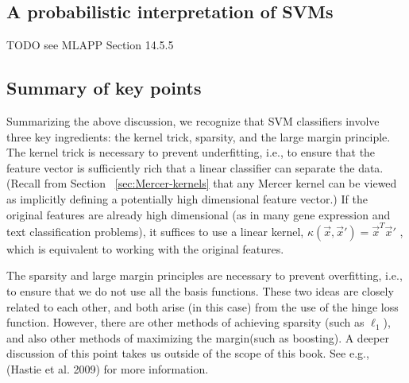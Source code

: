 \subsection{A probabilistic interpretation of SVMs}
TODO see MLAPP Section 14.5.5


\subsection{Summary of key points}
Summarizing the above discussion, we recognize that SVM classifiers involve three key ingredients: the kernel trick, sparsity, and the large margin principle. The kernel trick is necessary to prevent underfitting, i.e., to ensure that the feature vector is sufficiently rich that a linear classifier can separate the data. (Recall from Section ~\ref{sec:Mercer-kernels} that any Mercer kernel can be viewed as implicitly defining a potentially high dimensional feature vector.) If the original features are already high dimensional (as in many gene expression and text classification problems), it suffices to use a linear kernel, $\kappa(\vec{x},\vec{x}')=\vec{x}^T\vec{x}'$ , which is equivalent to working with the original features.

The sparsity and large margin principles are necessary to prevent overfitting, i.e., to ensure that we do not use all the basis functions. These two ideas are closely related to each other, and both arise (in this case) from the use of the hinge loss function. However, there are other methods of achieving sparsity (such as $\ell_1$), and also other methods of maximizing the margin(such as boosting). A deeper discussion of this point takes us outside of the scope of this book. See e.g., (Hastie et al. 2009) for more information.


